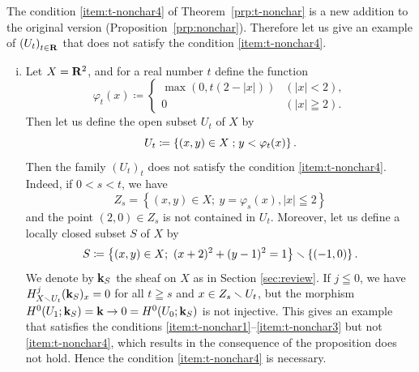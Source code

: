 \begin{Example+}\label{eg:t-nonchar}
  The condition \eqref{item:t-nonchar4} of 
  Theorem~\ref{prp:t-nonchar} is a new addition to
  the original version (Proposition~\ref{prp:nonchar}). 
  Therefore let us give an example of \(\left(U_{t}\right)_{t\in\mathbf{R}}\) 
  that does not satisfy the condition \eqref{item:t-nonchar4}. 
  \begin{enumerate}[(i)]
    \item \label{item:not-gentle} 
    Let \(X=\mathbf{R}^2\), and for a real number \(t\) define the 
    function\[
      \varphi_{t}(x)\coloneqq\begin{cases}
        \max\left(0,t(2-\left|x\right|)\right)&(\left|x\right| < 2),\\
        0& (\left|x\right|\geqq 2).
      \end{cases}
    \]
    Then let us define the open subset \(U_t\)
    of \(X\) by
    \[
      U_{t}\coloneqq
      \left\{
        (x,y)\in X\mathrel{;} y<\varphi_{t}(x)
      \right\}. 
    \]
    Then the family \((U_{t})_{t}\) does not satisfy 
    the condition \eqref{item:t-nonchar4}. 
    Indeed, if \(0<s<t\), 
    we have 
    \[
      Z_{s}=\left\{
        (x,y)\in X;\ y=\varphi_{s}(x), \left|x\right|\leqq 2
      \right\}
    \] and the point \((2,0)\in Z_{s}\) is 
    not contained in \(U_{t}\). 
    Moreover, let us define 
    a locally closed subset \(S\) of \(X\) by
    \[
      S\coloneqq 
      \left\{(x,y)\in X;\ (x+2)^{2}+(y-1)^{2}=1\right\}
      \smallsetminus 
      \left\{(-1,0)\right\}. 
    \]
    We denote by \(\mathbf{k}_{S}\) 
    the sheaf on \(X\) as in Section \ref{sec:review}. 
    If \(j\leqq0\), we have \(
      H^{j}_{X\smallsetminus U_{t}}(\mathbf{k}_{S})_{x}=0
    \) for all \(t \geqq s\) and \(x\in Z_{s}\smallsetminus U_{t}\), 
    but the morphism \(
      H^{0}(U_{1};\mathbf{k}_{S})=\mathbf{k}
      \to 
      0 = H^{0}(U_{0};\mathbf{k}_{S})
    \) is not injective. 
    This gives an example that 
    satisfies the conditions 
    \eqref{item:t-nonchar1}--\eqref{item:t-nonchar3} but 
    not \eqref{item:t-nonchar4}, 
    which results in the consequence of the proposition does not hold. 
    Hence the condition \eqref{item:t-nonchar4} is 
    necessary. 
    \begin{figure}[htb]
      \centering
\end{figure}
\end{enumerate}
\end{Example+}

